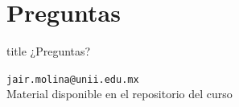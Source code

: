 \documentclass[aspectratio=169,10pt]{beamer}
\begin{document}
\section*{Preguntas}

\begin{frame}
\vfill
\centering
\begin{beamercolorbox}[sep=8pt,center,shadow=true,rounded=true]{title}
\Huge ¿Preguntas?
\end{beamercolorbox}
\vfill

\begin{center}
\large
\texttt{jair.molina@unii.edu.mx}\\[2mm]
\small
Material disponible en el repositorio del curso
\end{center}

\end{frame}
\end{document}
